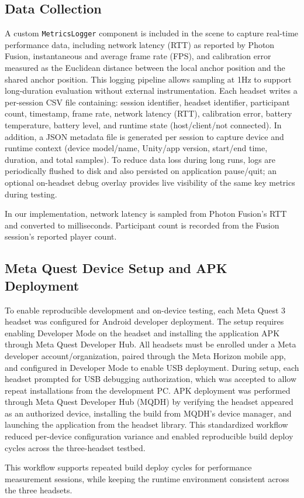 \subsection{Data Collection}
\label{sec:prototype-logging}
A custom \texttt{MetricsLogger} component is included in the scene to capture real-time performance data, including network latency (RTT) as reported by Photon Fusion\cite{PhotonFusionDocs}, instantaneous and average frame rate (FPS), and calibration error measured as the Euclidean distance between the local anchor position and the shared anchor position.
This logging pipeline allows sampling at 1Hz to support long-duration evaluation without external instrumentation. Each headset writes a per-session CSV file containing: session identifier, headset identifier, participant count, timestamp, frame rate, network latency (RTT), calibration error, battery temperature, battery level, and runtime state (host/client/not connected). In addition, a JSON metadata file is generated per session to capture device and runtime context (device model/name, Unity/app version, start/end time, duration, and total samples). To reduce data loss during long runs, logs are periodically flushed to disk and also persisted on application pause/quit; an optional on-headset debug overlay provides live visibility of the same key metrics during testing.

In our implementation, network latency is sampled from Photon Fusion's RTT and converted to milliseconds\cite{PhotonFusionDocs}. Participant count is recorded from the Fusion session's reported player count.


\subsection{Meta Quest Device Setup and APK Deployment}
\label{sec:prototype-deployment}
To enable reproducible development and on-device testing, each Meta Quest 3 headset was configured for Android developer deployment. The setup requires enabling Developer Mode on the headset and installing the application APK through Meta Quest Developer Hub\cite{MetaMQDHGettingStarted2025}.
All headsets must be enrolled under a Meta developer account/organization, paired through the Meta Horizon mobile app, and configured in Developer Mode to enable USB deployment. During setup, each headset prompted for USB debugging authorization, which was accepted to allow repeat installations from the development PC. APK deployment was performed through Meta Quest Developer Hub (MQDH) by verifying the headset appeared as an authorized device, installing the build from MQDH's device manager, and launching the application from the headset library. This standardized workflow reduced per-device configuration variance and enabled reproducible build deploy cycles across the three-headset testbed.

This workflow supports repeated build deploy cycles for performance measurement sessions, while keeping the runtime environment consistent across the three headsets.
